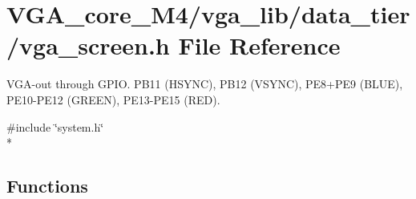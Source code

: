 \section{V\+G\+A\+\_\+core\+\_\+\+M4/vga\+\_\+lib/data\+\_\+tier/vga\+\_\+screen.h File Reference}
\label{vga__screen_8h}


V\+G\+A-\/out through G\+P\+IO. P\+B11 (H\+S\+Y\+NC), P\+B12 (V\+S\+Y\+NC), P\+E8+\+P\+E9 (B\+L\+UE), P\+E10-\/\+P\+E12 (G\+R\+E\+EN), P\+E13-\/\+P\+E15 (R\+ED).  


{\ttfamily \#include \char`\"{}system.\+h\char`\"{}}\\*
\subsection*{Functions}
